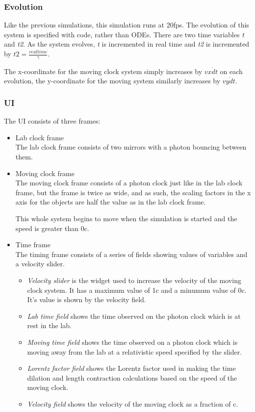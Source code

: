 \subsubsection*{Evolution}
\label{sec-3-3-2}

    Like the previous simulations, this simulation runs at 20fps. The evolution of this system is specified with code, rather than ODEs. There are two time variables \emph{t} and \emph{t2}. As the system evolves, \emph{t} is incremented in real time and \emph{t2} is incremented by $t2 = \frac{real time}{\gamma}$.

    The x-coordinate for the moving clock system simply increases by $vx\dot dt$ on each evolution, the y-coordinate for the moving system similarly increases by $vy\dot dt$.
\subsubsection*{UI}
\label{sec-3-3-3}

The UI consists of three frames:
\begin{itemize}

\item Lab clock frame\\
\label{sec-3-3-3-1}%
The lab clock frame consists of two mirrors with a photon bouncing between them.

\item Moving clock frame\\
\label{sec-3-3-3-2}%
The moving clock frame consists of a photon clock just like in the lab clock frame, but the frame is twice as wide, and as such, the scaling factors in the x axis for the objects are half the value as in the lab clock frame.

This whole system begins to move when the simulation is started and the speed is greater than 0c.

\item Time frame\\
\label{sec-3-3-3-3}%
The timing frame consists of a series of fields showing values of variables and a velocity slider.

\begin{itemize}
\item \emph{Velocity slider} is the widget used to increase the velocity of the moving clock system. It has a maximum value of 1c and a minumum value of 0c. It's value is shown by the velocity field.
\item \emph{Lab time field} shows the time observed on the photon clock which is at rest in the lab.
\item \emph{Moving time field} shows the time observed on a photon clock which is moving away from the lab at a relativistic speed specified by the slider.
\item \emph{Lorentz factor field} shows the Lorentz factor used in making the time dilation and length contraction calculations based on the speed of the moving clock.
\item \emph{Velocity field} shows the velocity of the moving clock as a fraction of c.
\end{itemize}
\end{itemize} %
